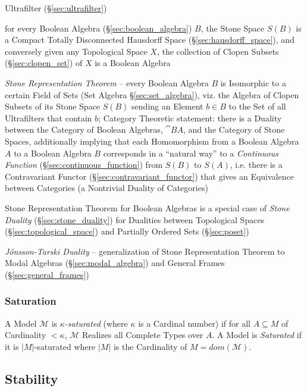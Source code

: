 Ultrafilter (\S\ref{sec:ultrafilter})

for every Boolean Algebra (\S\ref{sec:boolean_algebra}) $B$, the Stone Space
$\xspace{S}(B)$ is a Compact Totally Disconnected Hausdorff Space
(\S\ref{sec:hausdorff_space}), and conversely given any Topological Space $X$,
the collection of Clopen Subsets (\S\ref{sec:clopen_set}) of $X$ is a Boolean
Algebra

\emph{Stone Representation Theorem} -- every Boolean Algebra $B$ is Isomorphic
to a certain Field of Sets (Set Algebra \S\ref{sec:set_algebra}), viz. the
Algebra of Clopen Subsets of its Stone Space $\xspace{S}(B)$ sending an Element
$b \in B$ to the Set of all Ultrafilters that contain $b$; Category Theoretic
statement: there is a Duality between the Category of Boolean Algebras,
$\cat{BA}$, and the Category of Stone Spaces, additionally implying that each
Homomorphism from a Boolean Algebra $A$ to a Boolean Algebra $B$ corresponds in
a ``natural way'' to a \emph{Continuous Function}
(\S\ref{sec:continuous_function}) from $S(B)$ to $S(A)$, i.e. there is a
Contravariant Functor (\S\ref{sec:contravariant_functor}) that gives an
Equivalence between Categories (a Nontrivial Duality of Categories)

\fist Stone Representation Theorem for Boolean Algebras is a special case of
\emph{Stone Duality} (\S\ref{sec:stone_duality}) for Dualities between
Topological Spaces (\S\ref{sec:topological_space}) and Partially Ordered Sets
(\S\ref{sec:poset})

\fist \emph{J\'onsson-Tarski Duality} --
generalization of Stone Representation Theorem to Modal Algebras
(\S\ref{sec:modal_algebra}) and General Frames (\S\ref{sec:general_frames})



\subsubsection{Saturation}\label{sec:model_saturation}

A Model $\mathcal{M}$ is \emph{$\kappa$-saturated} (where $\kappa$ is
a Cardinal number) if for all $A \subseteq M$ of Cardinality $<
\kappa$, $\mathcal{M}$ Realizes all Complete Types over $A$. A Model
is \emph{Saturated} if it is $|M|$-saturated where $|M|$ is the
Cardinality of $M = dom(\mathcal{M})$.



\subsection{Stability}\label{sec:model_stability}


